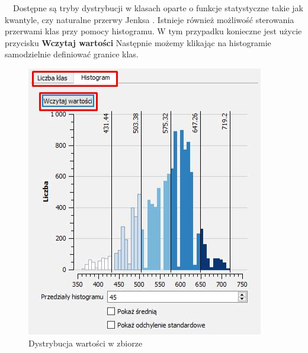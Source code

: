 \documentclass[12pt,a4paper]{book}
\begin{document}
\ \ Dostępne są tryby dystrybucji w klasach oparte o funkcje statystyczne takie jak kwantyle, czy naturalne przerwy Jenksa \cite{Jenks}. Istnieje również możliwość sterowania przerwami klas przy pomocy histogramu. W tym przypadku konieczne jest użycie przycisku \textbf{Wczytaj wartości} Następnie możemy klikając na histogramie samodzielnie definiować granice klas.
\begin{figure}
	\centering
	\includegraphics[scale=0.4]{007-histogram.png}
	\caption{Dystrybucja wartości w zbiorze}
\end{figure}
\end{document}
